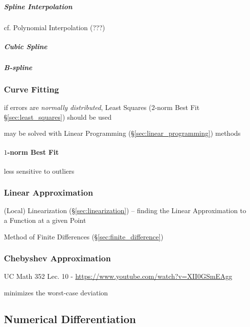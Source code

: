 \subparagraph{Spline Interpolation}\label{sec:spline_interpolation}\hfill

cf. Polynomial Interpolation (???) %



\subparagraph{Cubic Spline}\label{sec:cubic_spline}\hfill

\subparagraph{B-spline}\label{sec:b_spline}\hfill



\subsubsection{Curve Fitting}\label{sec:curve_fitting}

\fist if errors are \emph{normally distributed}, Least Squares ($2$-norm Best
Fit \S\ref{sec:least_squares}) should be used

may be solved with Linear Programming (\S\ref{sec:linear_programming}) methods



\paragraph{$1$-norm Best Fit}\label{sec:1norm_best_fit}\hfill

less sensitive to outliers



\subsubsection{Linear Approximation}\label{sec:linear_approximation}

\fist (Local) Linearization (\S\ref{sec:linearization}) -- finding the Linear
Approximation to a Function at a given Point

\fist Method of Finite Differences (\S\ref{sec:finite_difference})



\subsubsection{Chebyshev Approximation}\label{sec:chebyshev_approximation}

UC Math 352 Lec. 10 - \url{https://www.youtube.com/watch?v=XII0GSmEAgg}

minimizes the worst-case deviation



\subsection{Numerical Differentiation}\label{sec:numerical_differentiation}

